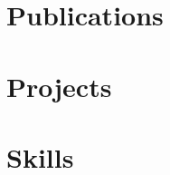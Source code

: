 \documentclass[9pt]{res}
\begin{document}
\begin{resume}
\section{Publications}
\vspace{0.1in}


\section{Projects}
\vspace{0.1in}



\section{Skills} 
\vspace{0.1in}
 

% 

\end{resume}
\end{document}
